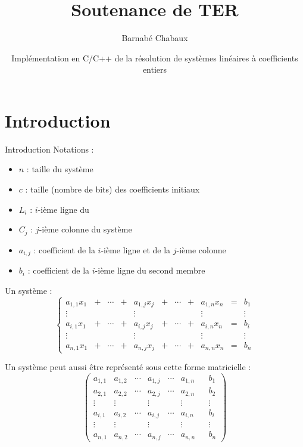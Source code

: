 \documentclass[11pt]{beamer}
\author{Barnabé Chabaux}
\title{Soutenance de TER}
\date{Implémentation en C/C++ de la résolution de systèmes linéaires à coefficients entiers}
\begin{document}
	\begin{frame}
		\titlepage
		\tableofcontents
	\end{frame}
	
	\section{Introduction}
	\begin{frame}{Introduction}
		Notations :
		\begin{itemize}
			\item $n$ : taille du système
			\item $c$ : taille (nombre de bits) des coefficients initiaux
			\item $L_i$ : $i$-ième ligne du 
			\item $C_j$ : $j$-ième colonne du système
			\item $a_{i,j}$ : coefficient de la $i$-ième ligne et de la $j$-ième colonne
			\item $b_i$ : coefficient de la $i$-ième ligne du second membre
		\end{itemize}
		Un système :
		$$\left \{
		\begin{array}{ccccccccccc}
			a_{1,1} x_1 &+ &\cdots &+ &a_{1,j} x_j &+ &\cdots &+ &a_{1,n} x_n &= & b_1\\
			\vdots & & & & \vdots & & & & \vdots & & \vdots\\
			a_{i,1} x_1 &+ &\cdots &+ &a_{i,j} x_j &+ &\cdots &+ &a_{i,n} x_n &= & b_i\\
			\vdots & & & & \vdots & & & & \vdots & & \vdots\\
			a_{n,1} x_1 &+ &\cdots &+ &a_{n,j} x_j &+ &\cdots &+ &a_{n,n} x_n &= & b_n
		\end{array}
		\right.
		$$
	\end{frame}
	
	\begin{frame}
		Un système peut aussi être représenté sous cette forme matricielle :
		\newline
		\begin{equation*}
			\begin{pmatrix}
				a_{1,1} & a_{1,2} & \cdots & a_{1,j} & \cdots & a_{1,n}&&b_1\\
				a_{2,1} & a_{2,2} & \cdots & a_{2,j} & \cdots & a_{2,n}&&b_2\\
				\vdots  & \vdots  & & \vdots & & \vdots&&\vdots\\
				a_{i,1} & a_{i,2} & \cdots & a_{i,j} & \cdots & a_{i,n}&&b_i\\
				\vdots  & \vdots  &  & \vdots & &\vdots&&\vdots\\
				a_{n,1} & a_{n,2} & \cdots & a_{n,j} & \cdots & a_{n,n}&&b_n
			\end{pmatrix}
		\end{equation*}
	\end{frame}
	
\end{document}
